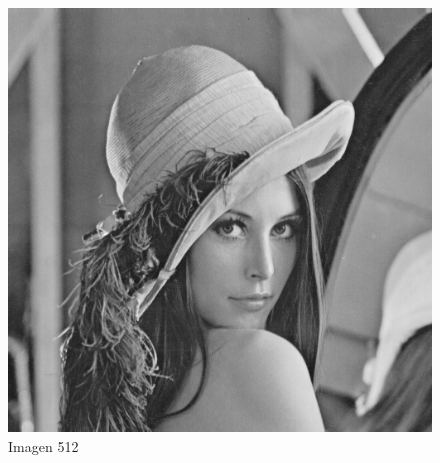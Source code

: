\documentclass{article}
\begin{document}
\begin{multicols}{2}





\begin{figure}[H]
\centering
\includegraphics[scale=0.2]{../img/lena512.bmp}
\caption{Imagen 512}
\label{Imagen 512}
\end{figure}


\end{multicols}
\end{document}
